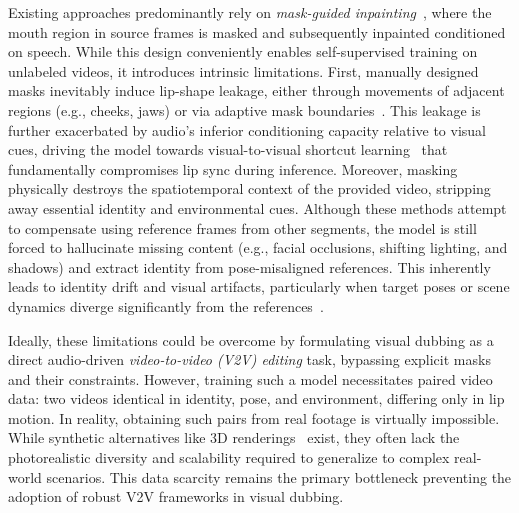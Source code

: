 \documentclass{article}
\theoremstyle{plain}
\theoremstyle{definition}
\theoremstyle{remark}
\begin{document}
Existing approaches predominantly rely on \textit{mask-guided inpainting}~\citep{prajwal2020wav2lip,li2024latentsync}, where the mouth region in source frames is masked and subsequently inpainted conditioned on speech.
While this design conveniently enables self-supervised training on unlabeled videos, it introduces intrinsic limitations.
First, manually designed masks inevitably induce lip-shape leakage, either through movements of adjacent regions (e.g., cheeks, jaws) or via adaptive mask boundaries~\citep{pan2025rasa}.
This leakage is further exacerbated by audio's inferior conditioning capacity relative to visual cues, driving the model towards visual-to-visual shortcut learning~\citep{bigata2025keysync} that fundamentally compromises lip sync during inference.
Moreover, masking physically destroys the spatiotemporal context of the provided video, stripping away essential identity and environmental cues.
Although these methods attempt to compensate using reference frames from other segments, the model is still forced to hallucinate missing content (e.g., facial occlusions, shifting lighting, and shadows) and extract identity from pose-misaligned references.
This inherently leads to identity drift and visual artifacts, particularly when target poses or scene dynamics diverge significantly from the references~\citep{zhong2023iplap,peng2025omnisync}.

Ideally, these limitations could be overcome by formulating visual dubbing as a direct audio-driven \textit{video-to-video (V2V) editing} task, bypassing explicit masks and their constraints.
However, training such a model necessitates paired video data: two videos identical in identity, pose, and environment, differing only in lip motion. 
In reality, obtaining such pairs from real footage is virtually impossible.
While synthetic alternatives like 3D renderings~\citep{chen2025cafe} exist, they often lack the photorealistic diversity and scalability required to generalize to complex real-world scenarios.
This data scarcity remains the primary bottleneck preventing the adoption of robust V2V frameworks in visual dubbing.
\end{document}
